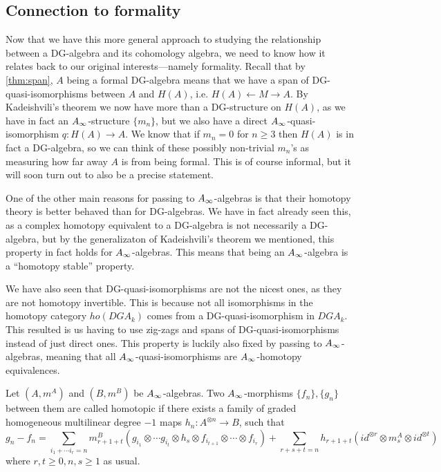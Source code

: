 \subsection{Connection to formality}

Now that we have this more general approach to studying the relationship between a DG-algebra and its cohomology algebra, we need to know how it relates back to our original interests---namely formality. Recall that by \cref{thm:span}, $A$ being a formal DG-algebra means that we have a span of DG-quasi-isomorphisms between $A$ and $H(A)$, i.e. $H(A)\longleftarrow M\longrightarrow A$. By Kadeishvili's theorem we now have more than a DG-structure on $H(A)$, as we have in fact an $\A$-structure $\{m_n\}$, but we also have a direct $\A$-quasi-isomorphism $q\colon H(A)\longrightarrow A$. We know that if $m_n = 0$ for $n\geq 3$ then $H(A)$ is in fact a DG-algebra, so we can think of these possibly non-trivial $m_n$'s as measuring how far away $A$ is from being formal. This is of course informal, but it will soon turn out to also be a precise statement. 

One of the other main reasons for passing to $\A$-algebras is that their homotopy theory is better behaved than for DG-algebras. We have in fact already seen this, as a complex homotopy equivalent to a DG-algebra is not necessarily a DG-algebra, but by the generalizaton of Kadeishvili's theorem we mentioned, this property in fact holds for $\A$-algebras. This means that being an $\A$-algebra is a ``homotopy stable'' property. 

We have also seen that DG-quasi-isomorphisms are not the nicest ones, as they are not homotopy invertible. This is because not all isomorphisms in the homotopy category $ho(DGA_k)$ comes from a DG-quasi-isomorphism in $DGA_k$. This resulted is us having to use zig-zags and spans of DG-quasi-isomorphisms instead of just direct ones. This property is luckily also fixed by passing to $\A$-algebras, meaning that all $\A$-quasi-isomorphisms are $\A$-homotopy equivalences. 


\begin{definition}[$\A$-homotopy]
Let $(A, m^A)$ and $(B, m^B)$ be $\A$-algebras. Two $\A$-morphisms $\{f_n\}, \{g_n\}$ between them are called homotopic if there exists a family of graded homogeneous multilinear degree $-1$ maps $h_n:A^{\otimes n}\longrightarrow B$, such that 
\begin{equation*}
    g_n-f_n = \sum_{i_1+\cdots i_r = n}m^B_{r+1+t} (g_{i_1}\otimes \cdots g_{i_t}\otimes h_s \otimes f_{i_{t+1}}\otimes \cdots \otimes f_{i_r} ) + \sum_{r+s+t = n}h_{r+1+t} (id^{\otimes r}\otimes m^A_s \otimes id^{\otimes t})
\end{equation*}
where $r, t\geq 0, n, s\geq 1$ as usual. 
\end{definition}


